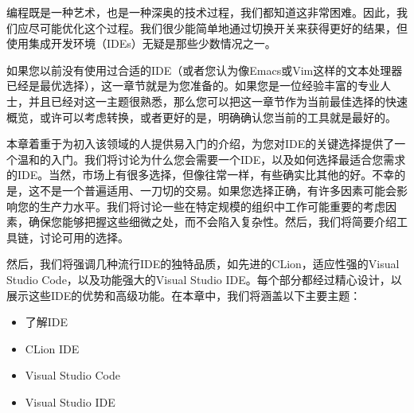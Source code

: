 编程既是一种艺术，也是一种深奥的技术过程，我们都知道这非常困难。因此，我们应尽可能优化这个过程。我们很少能简单地通过切换开关来获得更好的结果，但使用集成开发环境（IDEs）无疑是那些少数情况之一。

如果您以前没有使用过合适的IDE（或者您认为像Emacs或Vim这样的文本处理器已经是最优选择），这一章节就是为您准备的。如果您是一位经验丰富的专业人士，并且已经对这一主题很熟悉，那么您可以把这一章节作为当前最佳选择的快速概览，或许可以考虑转换，或者更好的是，明确确认您当前的工具就是最好的。

本章着重于为初入该领域的人提供易入门的介绍，为您对IDE的关键选择提供了一个温和的入门。我们将讨论为什么您会需要一个IDE，以及如何选择最适合您需求的IDE。当然，市场上有很多选择，但像往常一样，有些确实比其他的好。不幸的是，这不是一个普遍适用、一刀切的交易。如果您选择正确，有许多因素可能会影响您的生产力水平。我们将讨论一些在特定规模的组织中工作可能重要的考虑因素，确保您能够把握这些细微之处，而不会陷入复杂性。然后，我们将简要介绍工具链，讨论可用的选择。

然后，我们将强调几种流行IDE的独特品质，如先进的CLion，适应性强的Visual Studio Code，以及功能强大的Visual Studio IDE。每个部分都经过精心设计，以展示这些IDE的优势和高级功能。在本章中，我们将涵盖以下主要主题：

\begin{itemize}
\item
了解IDE

\item
CLion IDE

\item
Visual Studio Code

\item
Visual Studio IDE
\end{itemize}




